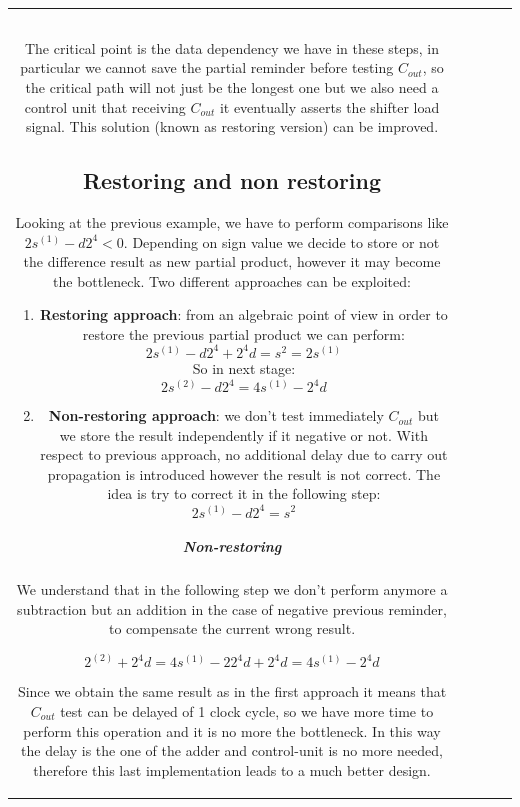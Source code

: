 \begin{center}
\begin{tabular}{|c|c|c|c|c|}
\begin{verbatim}
\end{verbatim}

The critical point is the data dependency we have in these steps, in particular we cannot save the partial reminder before testing $C_{out}$, so the critical path will not just be the longest one but we also need a control unit that receiving $C_{out}$ it eventually asserts the shifter load signal. This solution (known as restoring version) can be improved.

\subsection{Restoring and non restoring}

Looking at the previous example, we have to perform comparisons like
$2s^{(1)}-d2^4 <0$. Depending on sign value we decide to store or not the difference result as new partial product, however it may become the bottleneck. Two different approaches can be exploited:

\begin{enumerate}
  \item \textbf{Restoring approach}: from an algebraic point of view in order to restore the previous partial product we can perform:
  $$ 2s^{(1)}-d2^4+2^4d=s^{2}=2s^{(1)}$$
  So in next stage:
  $$ 2s^{(2)}-d2^4=4s^{(1)}-2^4 d$$

  \item \textbf{Non-restoring approach}: we don't test immediately $C_{out}$ but we store the result independently if it negative or not. With respect to previous approach, no additional delay due to carry out propagation is introduced however the result is not correct. The idea is try to correct it in the following step:
  $$2s^{(1)}-d2^4=s^{2}$$
\end{enumerate}

\subparagraph{Non-restoring}
We understand that in the following step we don't perform anymore a subtraction but an addition in the case of negative previous reminder, to compensate the current wrong result.

$$2^{(2)}+2^4 d=4s^{(1)}-2 2^4 d + 2^4 d = 4s^{(1)} -2^4d$$

Since we obtain the same result as in the first approach it means that $C_{out}$ test can be delayed of 1 clock cycle, so we have more time to perform this operation and it is no more the bottleneck. In this way the delay is the one of the adder and control-unit is no more needed, therefore this last implementation leads to a much better design.


\end{tabular}
\end{center}
